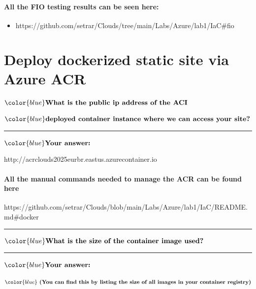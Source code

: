 \documentclass[11pt]{article}
\providecommand{\tightlist}{%
      \setlength{\itemsep}{0pt}\setlength{\parskip}{0pt}}
\begin{document}
\paragraph{All the FIO testing results can be seen
here:}\label{all-the-fio-testing-results-can-be-seen-here}

\begin{itemize}
\tightlist
\item
  https://github.com/setrar/Clouds/tree/main/Labs/Azure/lab1/IaC\#fio
\end{itemize}

    \section{Deploy dockerized static site via Azure
ACR}\label{deploy-dockerized-static-site-via-azure-acr}

    \(\color{blue}\textbf{What is the public ip address of the ACI }\)

\(\color{blue}\textbf{deployed container instance where we can access your site?}\)

\begin{center}\rule{0.5\linewidth}{0.5pt}\end{center}

\(\color{blue} \textbf{Your answer:}\)

http://acrclouds2025eurbr.eastus.azurecontainer.io

\paragraph{All the manual commands needed to manage the ACR can be found
here}\label{all-the-manual-commands-needed-to-manage-the-acr-can-be-found-here}

https://github.com/setrar/Clouds/blob/main/Labs/Azure/lab1/IaC/README.md\#docker

\begin{center}\rule{0.5\linewidth}{0.5pt}\end{center}

\(\color{blue}\textbf{What is the size of the container image used?}\)

\begin{center}\rule{0.5\linewidth}{0.5pt}\end{center}

\(\color{blue} \textbf{Your answer:}\)

\(\color{blue}\textbf{ (You can find this by listing the size of all images in your container registry)}\)
\end{document}
